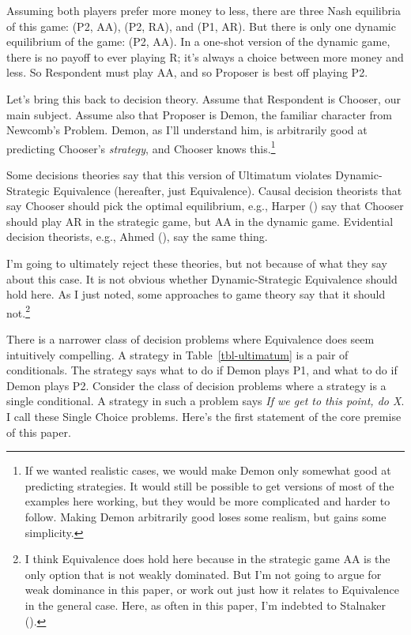 \documentclass[
  10pt,
  letterpaper,
  DIV=11,
  numbers=noendperiod,
  twoside]{scrartcl}
\begin{document}
Assuming both players prefer more money to less, there are three Nash
equilibria of this game: (P2, AA), (P2, RA), and (P1, AR). But there is
only one dynamic equilibrium of the game: (P2, AA). In a one-shot
version of the dynamic game, there is no payoff to ever playing R; it's
always a choice between more money and less. So Respondent must play AA,
and so Proposer is best off playing P2.

Let's bring this back to decision theory. Assume that Respondent is
Chooser, our main subject. Assume also that Proposer is Demon, the
familiar character from Newcomb's Problem. Demon, as I'll understand
him, is arbitrarily good at predicting Chooser's \emph{strategy}, and
Chooser knows this.\footnote{If we wanted realistic cases, we would make
  Demon only somewhat good at predicting strategies. It would still be
  possible to get versions of most of the examples here working, but
  they would be more complicated and harder to follow. Making Demon
  arbitrarily good loses some realism, but gains some simplicity.}

Some decisions theories say that this version of Ultimatum violates
Dynamic-Strategic Equivalence (hereafter, just Equivalence). Causal
decision theorists that say Chooser should pick the optimal equilibrium,
e.g., Harper () say that Chooser should
play AR in the strategic game, but AA in the dynamic game. Evidential
decision theorists, e.g., Ahmed (), say
the same thing.

I'm going to ultimately reject these theories, but not because of what
they say about this case. It is not obvious whether Dynamic-Strategic
Equivalence should hold here. As I just noted, some approaches to game
theory say that it should not.\footnote{I think Equivalence does hold
  here because in the strategic game AA is the only option that is not
  weakly dominated. But I'm not going to argue for weak dominance in
  this paper, or work out just how it relates to Equivalence in the
  general case. Here, as often in this paper, I'm indebted to Stalnaker
  ().}

There is a narrower class of decision problems where Equivalence does
seem intuitively compelling. A strategy in Table~\ref{tbl-ultimatum} is
a pair of conditionals. The strategy says what to do if Demon plays P1,
and what to do if Demon plays P2. Consider the class of decision
problems where a strategy is a single conditional. A strategy in such a
problem says \emph{If we get to this point, do X}. I call these Single
Choice problems. Here's the first statement of the core premise of this
paper.
\end{document}
